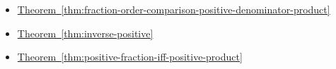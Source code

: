 \begin{dependencies}
\begin{itemize}
  \item \hyperref[thm:fraction-order-comparison-positive-denominator-product]{Theorem~\ref*{thm:fraction-order-comparison-positive-denominator-product}}
  \item \hyperref[thm:inverse-positive]{Theorem~\ref*{thm:inverse-positive}}
  \item \hyperref[thm:positive-fraction-iff-positive-product]{Theorem~\ref*{thm:positive-fraction-iff-positive-product}}
\end{itemize}
\end{dependencies}

\clearpage
